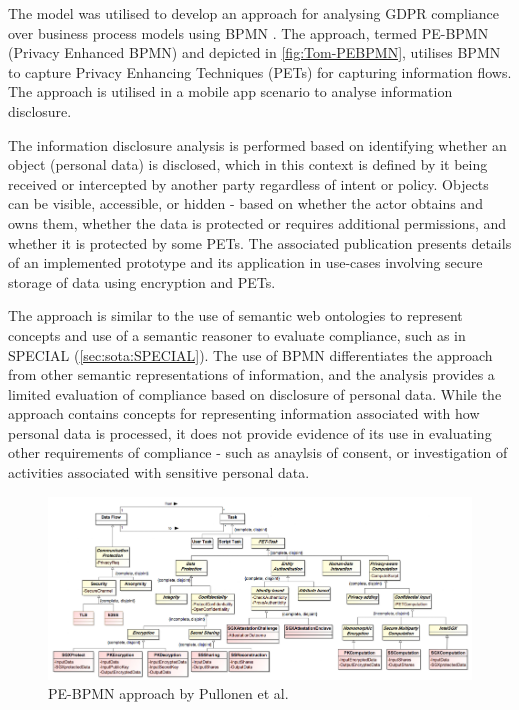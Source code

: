 The model was utilised to develop an approach for analysing GDPR compliance over business process models using BPMN \cite{pullonen_privacy-enhanced_2019}.
The approach, termed PE-BPMN (Privacy Enhanced BPMN) and depicted in \autoref{fig:Tom-PEBPMN}, utilises BPMN to capture Privacy Enhancing Techniques (PETs) for capturing information flows. The approach is utilised in a mobile app scenario to analyse information disclosure.

The information disclosure analysis is performed based on identifying whether an object (personal data) is disclosed, which in this context is defined by it being received or intercepted by another party regardless of intent or policy. Objects can be visible, accessible, or hidden - based on whether the actor obtains and owns them, whether the data is protected or requires additional permissions, and whether it is protected by some PETs. The associated publication \cite{pullonen_privacy-enhanced_2019} presents details of an implemented prototype and its application in use-cases involving secure storage of data using encryption and PETs. 

The approach is similar to the use of semantic web ontologies to represent concepts and use of a semantic reasoner to evaluate compliance, such as in SPECIAL (\autoref{sec:sota:SPECIAL}). The use of BPMN differentiates the approach from other semantic representations of information, and the analysis provides a limited evaluation of compliance based on disclosure of personal data. While the approach contains concepts for representing information associated with how personal data is processed, it does not provide evidence of its use in evaluating other requirements of compliance - such as anaylsis of consent, or investigation of activities associated with sensitive personal data.
\begin{figure}[htbp]
    \centering
    \includegraphics[width=\linewidth]{img/Tom_PEBPMN.png}
    \caption{PE-BPMN approach by Pullonen et al. \cite{pullonen_privacy-enhanced_2019}}
    \label{fig:Tom-PEBPMN}
\end{figure}

